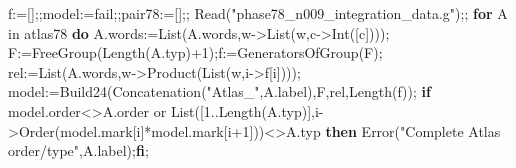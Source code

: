 \documentclass[
  10pt,
  letterpaper,
]{article}
\newenvironment{Shaded}{}{}
\newcommand{\BuiltInTok}[1]{\textcolor[rgb]{0.00,0.50,0.00}{#1}}
\newcommand{\ConstantTok}[1]{\textcolor[rgb]{0.53,0.00,0.00}{#1}}
\newcommand{\ControlFlowTok}[1]{\textcolor[rgb]{0.00,0.44,0.13}{\textbf{#1}}}
\newcommand{\ExtensionTok}[1]{#1}
\newcommand{\FloatTok}[1]{\textcolor[rgb]{0.25,0.63,0.44}{#1}}
\newcommand{\NormalTok}[1]{#1}
\newcommand{\OperatorTok}[1]{\textcolor[rgb]{0.40,0.40,0.40}{#1}}
\newcommand{\StringTok}[1]{\textcolor[rgb]{0.25,0.44,0.63}{#1}}
\newcommand{\VariableTok}[1]{\textcolor[rgb]{0.10,0.09,0.49}{#1}}
\begin{document}
\begin{Shaded}
\begin{Highlighting}[]
\VariableTok{f}\OperatorTok{:=}\NormalTok{[]}\OperatorTok{;;}\VariableTok{model}\OperatorTok{:=}\ConstantTok{fail}\OperatorTok{;;}\VariableTok{pair78}\OperatorTok{:=}\NormalTok{[]}\OperatorTok{;;}
\BuiltInTok{Read}\NormalTok{(}\StringTok{"phase78\_n009\_integration\_data.g"}\NormalTok{)}\OperatorTok{;;}
\ControlFlowTok{for} \VariableTok{A} \ExtensionTok{in} \VariableTok{atlas78} \ControlFlowTok{do}
 \VariableTok{A}\NormalTok{.}\VariableTok{words}\OperatorTok{:=}\BuiltInTok{List}\NormalTok{(}\VariableTok{A}\NormalTok{.}\VariableTok{words}\OperatorTok{,}\VariableTok{w}\OperatorTok{{-}\textgreater{}}\BuiltInTok{List}\NormalTok{(}\VariableTok{w}\OperatorTok{,}\VariableTok{c}\OperatorTok{{-}\textgreater{}}\BuiltInTok{Int}\NormalTok{([}\VariableTok{c}\NormalTok{])))}\OperatorTok{;}
 \VariableTok{F}\OperatorTok{:=}\BuiltInTok{FreeGroup}\NormalTok{(}\BuiltInTok{Length}\NormalTok{(}\VariableTok{A}\NormalTok{.}\VariableTok{typ}\NormalTok{)}\OperatorTok{+}\FloatTok{1}\NormalTok{)}\OperatorTok{;}\VariableTok{f}\OperatorTok{:=}\BuiltInTok{GeneratorsOfGroup}\NormalTok{(}\VariableTok{F}\NormalTok{)}\OperatorTok{;}
 \VariableTok{rel}\OperatorTok{:=}\BuiltInTok{List}\NormalTok{(}\VariableTok{A}\NormalTok{.}\VariableTok{words}\OperatorTok{,}\VariableTok{w}\OperatorTok{{-}\textgreater{}}\BuiltInTok{Product}\NormalTok{(}\BuiltInTok{List}\NormalTok{(}\VariableTok{w}\OperatorTok{,}\VariableTok{i}\OperatorTok{{-}\textgreater{}}\VariableTok{f}\NormalTok{[}\VariableTok{i}\NormalTok{])))}\OperatorTok{;}
 \VariableTok{model}\OperatorTok{:=}\VariableTok{Build24}\NormalTok{(}\BuiltInTok{Concatenation}\NormalTok{(}\StringTok{"Atlas\_"}\OperatorTok{,}\VariableTok{A}\NormalTok{.}\VariableTok{label}\NormalTok{)}\OperatorTok{,}\VariableTok{F}\OperatorTok{,}\VariableTok{rel}\OperatorTok{,}\BuiltInTok{Length}\NormalTok{(}\VariableTok{f}\NormalTok{))}\OperatorTok{;}
 \ControlFlowTok{if} \VariableTok{model}\NormalTok{.}\VariableTok{order}\OperatorTok{\textless{}\textgreater{}}\VariableTok{A}\NormalTok{.}\VariableTok{order} \ConstantTok{or} \BuiltInTok{List}\NormalTok{([}\FloatTok{1}\OperatorTok{..}\BuiltInTok{Length}\NormalTok{(}\VariableTok{A}\NormalTok{.}\VariableTok{typ}\NormalTok{)]}\OperatorTok{,}\VariableTok{i}\OperatorTok{{-}\textgreater{}}\BuiltInTok{Order}\NormalTok{(}\VariableTok{model}\NormalTok{.}\VariableTok{mark}\NormalTok{[}\VariableTok{i}\NormalTok{]}\OperatorTok{*}\VariableTok{model}\NormalTok{.}\VariableTok{mark}\NormalTok{[}\VariableTok{i}\OperatorTok{+}\FloatTok{1}\NormalTok{]))}\OperatorTok{\textless{}\textgreater{}}\VariableTok{A}\NormalTok{.}\VariableTok{typ} \ControlFlowTok{then} \BuiltInTok{Error}\NormalTok{(}\StringTok{"Complete Atlas order/type"}\OperatorTok{,}\VariableTok{A}\NormalTok{.}\VariableTok{label}\NormalTok{)}\OperatorTok{;}\ControlFlowTok{fi}\OperatorTok{;}

\end{Highlighting}
\end{Shaded}
\end{document}
